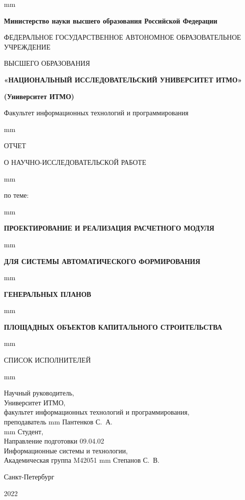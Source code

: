 \thispagestyle{empty}
 mm
\centerline{\footnotesize{\textbf{Министерство науки высшего образования Российской Федерации}}}
\centerline{\footnotesize{ФЕДЕРАЛЬНОЕ ГОСУДАРСТВЕННОЕ АВТОНОМНОЕ ОБРАЗОВАТЕЛЬНОЕ УЧРЕЖДЕНИЕ}}
\centerline{\small{ВЫСШЕГО ОБРАЗОВАНИЯ}}
\centerline{\textbf{«НАЦИОНАЛЬНЫЙ ИССЛЕДОВАТЕЛЬСКИЙ УНИВЕРСИТЕТ ИТМО»}}
\centerline{\textbf{(Университет ИТМО)}}
\centerline{Факультет информационных технологий и программирования}

 mm
\centerline{\LARGE{ОТЧЕТ}}
\centerline{\LARGE{О НАУЧНО-ИССЛЕДОВАТЕЛЬСКОЙ РАБОТЕ}}
 mm
\centerline{\large{по теме:}}
 mm
\centerline{\large\textbf{ПРОЕКТИРОВАНИЕ И РЕАЛИЗАЦИЯ РАСЧЕТНОГО МОДУЛЯ}}
 mm
\centerline{\large\textbf{ДЛЯ СИСТЕМЫ АВТОМАТИЧЕСКОГО ФОРМИРОВАНИЯ}}
 mm
\centerline{\large\textbf{ГЕНЕРАЛЬНЫХ ПЛАНОВ}}
 mm
\centerline{\large\textbf{ПЛОЩАДНЫХ ОБЪЕКТОВ КАПИТАЛЬНОГО СТРОИТЕЛЬСТВА}}
 mm
\centerline{\large{СПИСОК ИСПОЛНИТЕЛЕЙ}}
 mm
\large{
\noindent
Научный руководитель, \\
Университет ИТМО, \\
факультет информационных технологий и программирования, \\
преподаватель  mm Пантенков С.~А.\\
 mm \noindent
Студент, \\
Направление подготовки 09.04.02 \\
Информационные системы и технологии, \\
Академическая группа M42051  mm Степанов С.~В.\\
\vfill \hfil \break
\centerline{\large Санкт-Петербург } \centerline{ 2022 }
}

